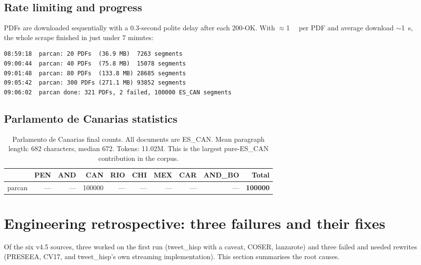 \documentclass[11pt,a4paper]{article}
\begin{document}
\subsection{Rate limiting and progress}

PDFs are downloaded sequentially with a 0.3-second polite delay after
each 200-OK. With $\approx$\SI{1}{\mega\byte} per PDF and average
download $\sim$\SI{1}{\second}, the whole scrape finished in just under
7 minutes:

\begin{lstlisting}[style=shellcode]
08:59:18  parcan: 20 PDFs  (36.9 MB)  7263 segments
09:00:44  parcan: 40 PDFs  (75.8 MB)  15078 segments
09:01:48  parcan: 80 PDFs  (133.8 MB) 28685 segments
09:05:42  parcan: 300 PDFs (271.1 MB) 93852 segments
09:06:02  parcan done: 321 PDFs, 2 failed, 100000 ES_CAN segments
\end{lstlisting}

\subsection{Parlamento de Canarias statistics}

\begin{table}[h]
\centering
\begin{tabular}{l r r r r r r r r r}
\toprule
 & \textbf{PEN} & \textbf{AND} & \textbf{CAN} & \textbf{RIO} & \textbf{CHI} & \textbf{MEX} & \textbf{CAR} & \textbf{AND\_BO} & \textbf{Total} \\
\midrule
parcan & --- & --- & \num{100000} & --- & --- & --- & --- & --- & \textbf{\num{100000}} \\
\bottomrule
\end{tabular}
\caption{Parlamento de Canarias final counts. All documents are ES\_CAN.
Mean paragraph length: 682 characters, median 672. Tokens: 11.02M. This
is the largest pure-ES\_CAN contribution in the corpus.}
\label{tab:parcan-stats}
\end{table}

\section{Engineering retrospective: three failures and their fixes}

Of the six v4.5 sources, three worked on the first run (tweet\_hisp with
a caveat, COSER, lanzarote) and three failed and needed rewrites
(PRESEEA, CV17, and tweet\_hisp's own streaming implementation). This
section summarises the root causes.
\end{document}
